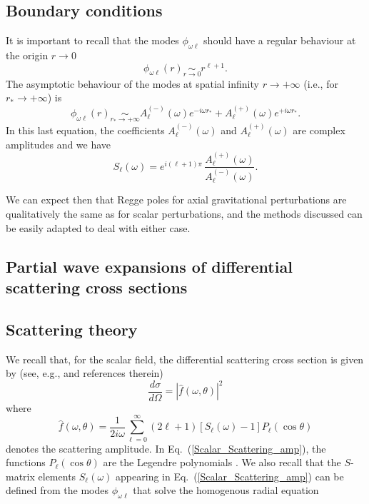 \documentclass[aps,prd,longbibliography,reprint,twocolumn,amsmath,amssymb,amsfonts,showpacs,superscriptaddress]{revtex4-1}%
\begin{document}
\subsection{Boundary conditions}
It is important to recall that the modes $\phi_{\omega \ell}$ should have a regular behaviour at the origin $r \to 0$
\begin{equation}\label{bc_1_in}
\phi_{\omega  \ell}(r) \scriptstyle{\underset{r \to 0}{\sim}}
\displaystyle{r^{\ell+1}}.
\end{equation}
The asymptotic behaviour of the modes at spatial infinity $r \to +\infty$ (i.e., for $r_\ast \to +\infty$) is
\begin{equation}\label{bc_2_in}
\phi_{\omega  \ell}(r) \scriptstyle{\underset{r_\ast \to +\infty}{\sim}}
\displaystyle{ A^{(-)}_\ell (\omega) e^{-i\omega r_\ast} + A^{(+)}_\ell (\omega) e^{+i\omega r_\ast}}.
\end{equation}
In this last equation, the coefficients $A^{(-)}_\ell (\omega)$ and  $A^{(+)}_\ell (\omega)$ are complex amplitudes and we have
\begin{equation}\label{Matrix_S}
  S_{\ell}(\omega) =  e^{i(\ell+1)\pi} \, \frac{A_{\ell}^{(+)}(\omega)}{A_{\ell}^{(-)}(\omega)}.
\end{equation}


We can expect then that Regge poles for axial gravitational perturbations are qualitatively the same as for scalar perturbations, and the methods discussed can be easily adapted to deal with either case.

\subsection{Partial wave expansions of differential scattering cross sections}
\label{SecIIb}



\subsection{Scattering theory}
We recall that, for the scalar field, the differential scattering cross section is given by (see, e.g.,\cite{Dolan:2017rtj} and references therein)
\begin{equation}\label{Scalar_Scattering_diff}
  \frac{d\sigma}{d\Omega} = |\hat{f}(\omega,\theta)|^2
\end{equation}
where
\begin{equation}\label{Scalar_Scattering_amp}
 \hat{f}(\omega,\theta) = \frac{1}{2 i \omega} \sum_{\ell = 0}^{\infty} (2\ell+1)[S_{\ell}(\omega)-1]P_{\ell}(\cos\theta)
\end{equation}
denotes the scattering amplitude.  In Eq.~(\ref{Scalar_Scattering_amp}), the functions $P_{\ell}(\cos\theta)$ are the Legendre polynomials \cite{AS65}.  We also recall that the $S$-matrix elements $S_{\ell}(\omega)$ appearing in Eq.~(\ref{Scalar_Scattering_amp}) can be defined from the modes $\phi_{\omega \ell}$ that solve the homogenous radial equation
\end{document}
